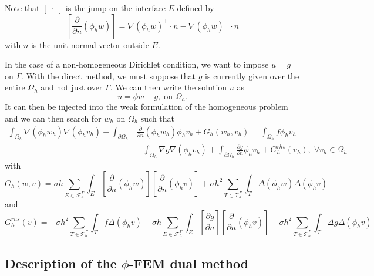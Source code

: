 \begin{Rem}
	Note that $[\;\cdot\;]$ is the jump on the interface $E$ defined by
	\begin{equation*}
		\left[\frac{\partial}{\partial n}(\phi_h w)\right]=\nabla(\phi_h w)^+\cdot n - \nabla(\phi_h w)^-\cdot n
	\end{equation*}
with $n$ is the unit normal vector outside $E$.
\end{Rem}

In the case of a non-homogeneous Dirichlet condition, we want to impose $u=g$ on $\Gamma$. With the direct method, we must suppose that $g$ is currently given over the entire $\Omega_h$ and not just over $\Gamma$. We can then write the solution $u$ as
\begin{equation*}
	u=\phi w +g, \; \text{on } \Omega_h.
\end{equation*}
It can then be injected into the weak formulation of the homogeneous problem and we can then search for $w_h$ on $\Omega_h$ such that
\begin{align*}
	\int_{\Omega_h}\nabla(\phi_h w_h)\nabla(\phi_h v_h)-\int_{\partial\Omega_h}&\frac{\partial}{\partial n}(\phi_h w_h)\phi_h v_h+G_h(w_h,v_h)=\int_{\Omega_h}f\phi_h v_h \\
	&-\int_{\Omega_h}\nabla g\nabla(\phi_h v_h)+\int_{\partial\Omega_h}\frac{\partial g}{\partial n}\phi_h v_h+G_h^{rhs}(v_h), \; \forall v_h\in \Omega_h
\end{align*}
with
\begin{equation*}
	G_h(w,v)=\sigma h\sum_{E\in\mathcal{F}_h^\Gamma}\int_E\left[\frac{\partial}{\partial n}(\phi_h w)\right]\left[\frac{\partial}{\partial n}(\phi_h v)\right]+\sigma h^2\sum_{T\in\mathcal{T}_h^\Gamma}\int_T \Delta(\phi_h w)\Delta(\phi_h v)
\end{equation*}
and
\begin{equation*}
	G_h^{rhs}(v)=-\sigma h^2\sum_{T\in\mathcal{T}_h^\Gamma}\int_T f\Delta(\phi_h v)-\sigma h\sum_{E\in\mathcal{F}_h^\Gamma}\int_E\left[\frac{\partial g}{\partial n}\right]\left[\frac{\partial}{\partial n}(\phi_h v)\right]-\sigma h^2\sum_{T\in\mathcal{T}_h^\Gamma}\int_T \Delta g\Delta(\phi_h v)
\end{equation*}

\subsection{Description of the $\phi$-FEM dual method} \label{FEMs.PhiFEM.dual_method}

